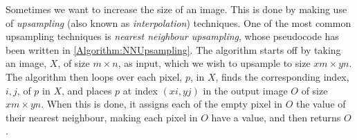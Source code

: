 \documentclass[./main.tex]{subfiles}
\begin{document}
Sometimes we want to increase the size of an image. This is done by making use of \textit{upsampling} (also known as \textit{interpolation}) techniques. One of the most common upsampling techniques is \textit{nearest neighbour upsampling}, whose pseudocode has been written in \ref{Algorithm:NNUpsampling}. The algorithm starts off by taking an image, $X$, of size $m \times n$, as input, which we wish to upsample to size $xm \times yn$. The algorithm then loops over each pixel, $p$, in $X$, finds the corresponding index, $i, j$, of $p$ in $X$, and places $p$ at index $(xi, yj)$ in the output image $O$ of size $xm \times yn$. When this is done, it assigns each of the empty pixel in $O$ the value of their nearest neighbour, making each pixel in $O$ have a value, and then returns $O$ \cite{NNUpsampling}.
\end{document}
